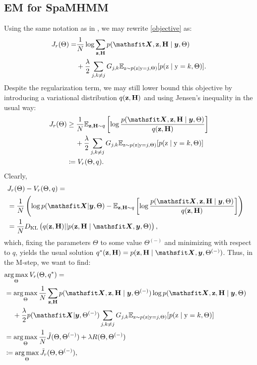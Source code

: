 \subsection{EM for SpaMHMM }
\label{sec:proof_em_reg}
Using the same notation as in , we may rewrite \eqref{objective} as:
\begin{align}
J_r(\Theta) = &\frac{1}{N}\log \sum_{\rvz,\rmH} p(\tX,\rvz,\rmH \mid \vy,\Theta) \nonumber\\
& +\frac{\reg}{2} \sum_{j,k\neq j} \emG_{j,k} \E_{\rz \sim p(\rz \mid \ry=j, \Theta)} [ p(\rz \mid \ry=k, \Theta) ].
\end{align}
Despite the regularization term, we may still lower bound this objective by introducing a variational distribution $q({\mathbf{z}},{\mathbf{H}})$ and using Jensen's inequality in the usual way:
\begin{align}
J_r(\Theta) &\geq \frac{1}{N} \E_{\rvz,\rmH \sim q} \left[\log \frac{p(\tX,\rvz,\rmH \mid \vy,\Theta)}{q(\rvz,\rmH)} \right] \nonumber\\
&\mathbin{\hphantom{=}}{} + \frac{\reg}{2} \sum_{j,k\neq j} \emG_{j,k} \E_{\rz \sim p(\rz \mid \ry=j, \Theta)} [ p(\rz \mid \ry=k, \Theta) ] \nonumber\\
&\coloneqq V_r(\Theta, q).
\end{align}
Clearly,
\begin{align}
\lefteqn{J_r(\Theta) - V_r(\Theta, q) =}\nonumber\\
&=\frac{1}{N} \left(\log p(\tX|\vy,\Theta) - \E_{\rvz,\rmH \sim q} \left[\log \frac{p(\tX,\rvz,\rmH \mid \vy,\Theta)}{q(\rvz,\rmH)} \right] \right) \nonumber\\
&= \frac{1}{N} \KL \left(q(\rvz,\rmH) || p(\rvz,\rmH \mid \tX,\vy,\Theta)  \right),
\end{align}
which, fixing the parameters $\Theta$ to some value $\Theta^{(-)}$ and minimizing with respect to $q$, yields the usual solution $q^*(\rvz,\rmH) = p(\rvz,\rmH \mid \tX,\vy,\Theta^{(-)})$. Thus, in the M-step, we want to find:
\begin{align}
\lefteqn{\argmax_\Theta V_r(\Theta, q^*) =} \nonumber\\
& =\argmax_\Theta \frac{1}{N}\sum_{\rvz,\rmH} p(\tX,\rvz,\rmH \mid \vy,\Theta^{(-)}) \log p(\tX,\rvz,\rmH \mid \vy,\Theta) \nonumber\\
& \mathbin{\hphantom{=}}{}+ \frac{\reg}{2} p(\tX|\vy,\Theta^{(-)}) \sum_{j,k\neq j} \emG_{j,k} \E_{\rz \sim p(\rz \mid \ry=j, \Theta)} [ p(\rz \mid \ry=k, \Theta) ] \nonumber\\
& = \argmax_\Theta \frac{1}{N}\tilde{J}(\Theta, \Theta^{(-)}) + \reg R(\Theta, \Theta^{(-)}) \nonumber\\
& \coloneqq \argmax_\Theta \tilde{J}_r(\Theta, \Theta^{(-)}),
\end{align}
